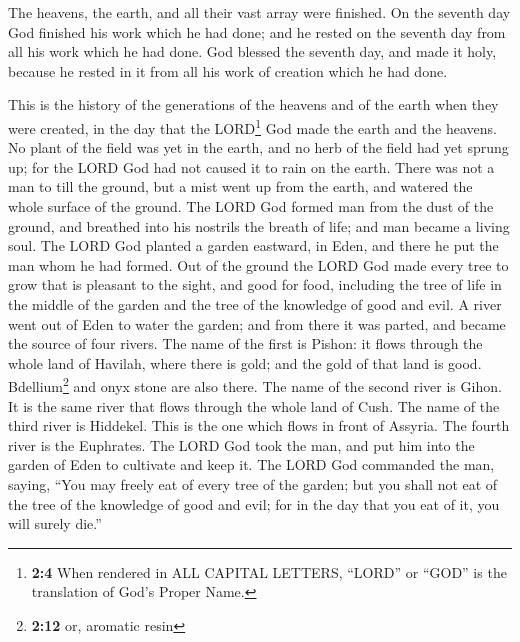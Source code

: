  The heavens, the earth, and all their vast array were
finished.  On the seventh day God finished his work which
he had done; and he rested on the seventh day from all his work which he
had done.  God blessed the seventh day, and made it holy,
because he rested in it from all his work of creation which he had done.

 This is the history of the generations of the heavens and
of the earth when they were created, in the day that the LORD\footnote{\textbf{2:4}
  When rendered in ALL CAPITAL LETTERS, ``LORD'' or ``GOD'' is the
  translation of God's Proper Name.} God made the earth and the heavens.
 No plant of the field was yet in the earth, and no herb
of the field had yet sprung up; for the LORD God had not caused it to
rain on the earth. There was not a man to till the ground,
 but a mist went up from the earth, and watered the whole
surface of the ground.  The LORD God formed man from the
dust of the ground, and breathed into his nostrils the breath of life;
and man became a living soul.  The LORD God planted a
garden eastward, in Eden, and there he put the man whom he had formed.
 Out of the ground the LORD God made every tree to grow
that is pleasant to the sight, and good for food, including the tree of
life in the middle of the garden and the tree of the knowledge of good
and evil.  A river went out of Eden to water the garden;
and from there it was parted, and became the source of four rivers.
 The name of the first is Pishon: it flows through the
whole land of Havilah, where there is gold;  and the gold
of that land is good. Bdellium\footnote{\textbf{2:12} or, aromatic resin}
and onyx stone are also there.  The name of the second
river is Gihon. It is the same river that flows through the whole land
of Cush.  The name of the third river is Hiddekel. This
is the one which flows in front of Assyria. The fourth river is the
Euphrates.  The LORD God took the man, and put him into
the garden of Eden to cultivate and keep it.  The LORD
God commanded the man, saying, ``You may freely eat of every tree of the
garden;  but you shall not eat of the tree of the
knowledge of good and evil; for in the day that you eat of it, you will
surely die.''


